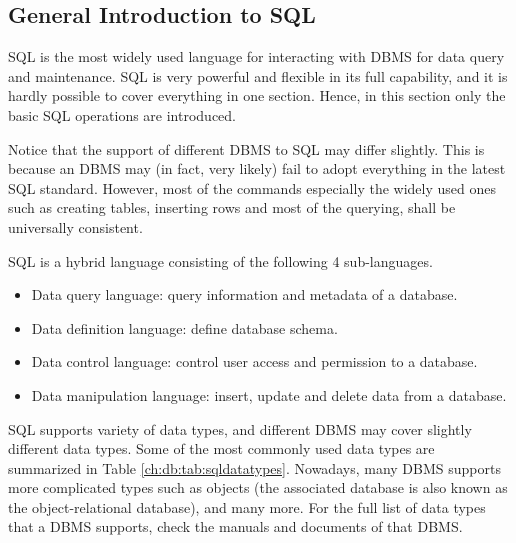 \subsection{General Introduction to SQL}

SQL is the most widely used language for interacting with DBMS for data query and maintenance. SQL is very powerful and flexible in its full capability, and it is hardly possible to cover everything in one section. Hence, in this section only the basic SQL operations are introduced.

Notice that the support of different DBMS to SQL may differ slightly. This is because an DBMS may (in fact, very likely) fail to adopt everything in the latest SQL standard. However, most of the commands especially the widely used ones such as creating tables, inserting rows and most of the querying, shall be universally consistent.

SQL is a hybrid language consisting of the following 4 sub-languages.
\begin{itemize}
  \item Data query language: query information and metadata of a database.
  \item Data definition language: define database schema.
  \item Data control language: control user access and permission to a database.
  \item Data manipulation language: insert, update and delete data from a database.
\end{itemize}

SQL supports variety of data types, and different DBMS may cover slightly different data types. Some of the most commonly used data types are summarized in Table \ref{ch:db:tab:sqldatatypes}. Nowadays, many DBMS supports more complicated types such as objects (the associated database is also known as the object-relational database), and many more. For the full list of data types that a DBMS supports, check the manuals and documents of that DBMS.

